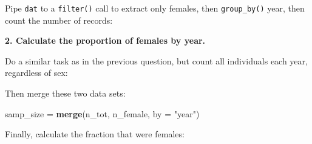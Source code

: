 \documentclass[]{book}
\newenvironment{Shaded}{\begin{snugshade}}{\end{snugshade}}
\newcommand{\DataTypeTok}[1]{\textcolor[rgb]{0.13,0.29,0.53}{#1}}
\newcommand{\KeywordTok}[1]{\textcolor[rgb]{0.13,0.29,0.53}{\textbf{#1}}}
\newcommand{\NormalTok}[1]{#1}
\newcommand{\OperatorTok}[1]{\textcolor[rgb]{0.81,0.36,0.00}{\textbf{#1}}}
\newcommand{\StringTok}[1]{\textcolor[rgb]{0.31,0.60,0.02}{#1}}
\begin{document}
Pipe \texttt{dat} to a \texttt{filter()} call to extract only females, then \texttt{group\_by()} year, then count the number of records:

\begin{Shaded}
\end{Shaded}

\textbf{2. Calculate the proportion of females by year.}

Do a similar task as in the previous question, but count all individuals each year, regardless of sex:

\begin{Shaded}
\end{Shaded}

Then merge these two data sets:

\begin{Shaded}
\begin{Highlighting}[]
\NormalTok{samp_size =}\StringTok{ }\KeywordTok{merge}\NormalTok{(n_tot, n_female, }\DataTypeTok{by =} \StringTok{"year"}\NormalTok{)}
\end{Highlighting}
\end{Shaded}

Finally, calculate the fraction that were females:

\begin{Shaded}
\end{Shaded}
\end{document}

